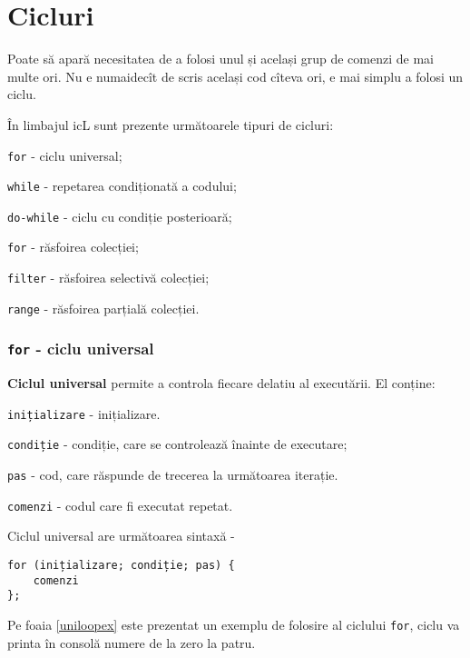 \section{Cicluri}

Poate să apară necesitatea de a folosi unul și același grup de comenzi de mai multe ori. Nu e numaidecît de scris același cod cîteva ori, e mai simplu a folosi un ciclu.

În limbajul icL sunt prezente următoarele tipuri de cicluri:

\begin{icItems}
\item
	\texttt{for} - ciclu universal;
\item
	\texttt{while} - repetarea condiționată a codului;
\item
	\texttt{do-while} - ciclu cu condiție posterioară;
\item
	\texttt{for} - răsfoirea colecției;
\item
	\texttt{filter} - răsfoirea selectivă colecției;
\item
	\texttt{range} - răsfoirea parțială colecției.
\end{icItems}


\subsubsection{\texttt{for} - ciclu universal}

{\bf Ciclul universal} permite a controla fiecare delatiu al executării. El conține:

\begin{icItems}
\item
	\texttt{inițializare} - inițializare.
\item
	\texttt{condiție} - condiție, care se controlează înainte de executare;
\item
	\texttt{pas} - cod, care răspunde de trecerea la următoarea iterație.
\item
	\texttt{comenzi} - codul care fi executat repetat.
\end{icItems}

Ciclul universal are următoarea sintaxă -
\begin{verbatim}
for (inițializare; condiție; pas) {
	comenzi
};
\end{verbatim}

Pe foaia \ref{uniloopex} este prezentat un exemplu de folosire al ciclului \texttt{for}, ciclu va printa în consolă numere de la zero la patru.

